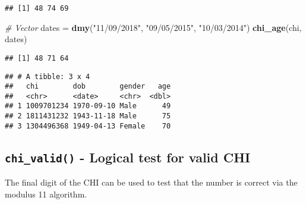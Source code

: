 \documentclass[]{book}
\newenvironment{Shaded}{\begin{snugshade}}{\end{snugshade}}
\newcommand{\CommentTok}[1]{\textcolor[rgb]{0.56,0.35,0.01}{\textit{#1}}}
\newcommand{\DataTypeTok}[1]{\textcolor[rgb]{0.13,0.29,0.53}{#1}}
\newcommand{\KeywordTok}[1]{\textcolor[rgb]{0.13,0.29,0.53}{\textbf{#1}}}
\newcommand{\NormalTok}[1]{#1}
\newcommand{\OperatorTok}[1]{\textcolor[rgb]{0.81,0.36,0.00}{\textbf{#1}}}
\newcommand{\StringTok}[1]{\textcolor[rgb]{0.31,0.60,0.02}{#1}}
\theoremstyle{definition}
\theoremstyle{definition}
\theoremstyle{definition}
\theoremstyle{remark}
\begin{document}
\begin{verbatim}
## [1] 48 74 69
\end{verbatim}

\begin{Shaded}
\begin{Highlighting}[]
\CommentTok{# Vector}
\NormalTok{dates =}\StringTok{ }\KeywordTok{dmy}\NormalTok{(}\StringTok{"11/09/2018"}\NormalTok{,}
            \StringTok{"09/05/2015"}\NormalTok{,}
            \StringTok{"10/03/2014"}\NormalTok{)}
\KeywordTok{chi_age}\NormalTok{(chi, dates)}
\end{Highlighting}
\end{Shaded}

\begin{verbatim}
## [1] 48 71 64
\end{verbatim}

\begin{Shaded}
\end{Shaded}

\begin{verbatim}
## # A tibble: 3 x 4
##   chi        dob        gender   age
##   <chr>      <date>     <chr>  <dbl>
## 1 1009701234 1970-09-10 Male      49
## 2 1811431232 1943-11-18 Male      75
## 3 1304496368 1949-04-13 Female    70
\end{verbatim}

\hypertarget{chi_valid---logical-test-for-valid-chi}{%
\subsection{\texorpdfstring{\texttt{chi\_valid()} - Logical test for
valid
CHI}{chi\_valid() - Logical test for valid CHI}}\label{chi_valid---logical-test-for-valid-chi}}

The final digit of the CHI can be used to test that the number is
correct via the modulus 11 algorithm.
\end{document}
